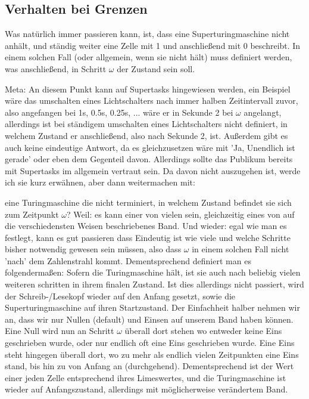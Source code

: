 \documentclass{scrartcl}
\begin{document}
\subsection{Verhalten bei Grenzen}
Was natürlich immer passieren kann, ist, dass eine Superturingmaschine nicht
anhält, und ständig weiter eine Zelle mit 1 und anschließend mit 0 beschreibt.
In einem solchen Fall (oder allgemein, wenn sie nicht hält) muss definiert
werden, was anschließend, in Schritt $\omega$ der Zustand sein soll.

Meta: An
diesem Punkt kann auf Supertasks hingewiesen werden, ein Beispiel wäre das
umschalten eines Lichtschalters nach immer halben Zeitintervall zuvor, also
angefangen bei 1s, 0.5s, 0.25s, ... wäre er in Sekunde 2 bei $\omega$
angelangt, allerdings ist bei ständigem umschalten eines Lichtschalters nicht
definiert, in welchem Zustand er anschließend, also nach Sekunde 2, ist.
Außerdem gibt es auch keine eindeutige Antwort, da es gleichzusetzen wäre mit
'Ja, Unendlich ist gerade' oder eben dem Gegenteil davon. Allerdings sollte das
Publikum bereits mit Supertasks im allgemein vertraut sein. Da davon nicht
auszugehen ist, werde ich sie kurz erwähnen, aber dann weitermachen mit:

eine
Turingmaschine die nicht terminiert, in welchem Zustand befindet sie sich zum Zeitpunkt
$\omega$? Weil: es kann einer von vielen sein, gleichzeitig eines von auf die
verschiedensten Weisen beschriebenes Band. Und wieder: egal wie man es festlegt,
kann es gut passieren dass Eindeutig ist wie viele und welche Schritte bisher
notwendig gewesen sein müssen, also dass $\omega$ in einem solchen Fall nicht
'nach' dem Zahlenstrahl kommt. Dementsprechend definiert man es folgendermaßen:
Sofern die Turingmaschine hält, ist sie auch nach beliebig vielen weiteren
schritten in ihrem finalen Zustand. Ist dies allerdings nicht passiert, wird
der Schreib-/Lesekopf wieder auf den Anfang gesetzt, sowie die
Superturingmaschine auf ihren Startzustand. Der Einfachheit halber nehmen wir
an, dass
wir nur Nullen (default) und Einsen auf unserem Band haben können. Eine Null
wird nun an Schritt $\omega$ überall dort stehen wo entweder keine Eins
geschrieben wurde, oder nur endlich oft eine Eins geschrieben wurde. Eine Eins
steht hingegen überall dort, wo zu mehr als endlich vielen Zeitpunkten eine
Eins stand, bis hin zu von Anfang an (durchgehend). Dementsprechend ist der
Wert einer jeden Zelle entsprechend ihres Limeswertes, und die Turingmaschine
ist wieder auf Anfangszustand, allerdings mit möglicherweise verändertem Band.
\end{document}
